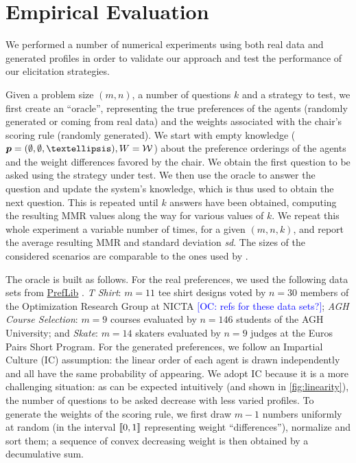 \documentclass{article}
\newcommand{\commentOC}[1]{\textcolor{blue}{\small$\big[$OC: #1$\big]$}}
\begin{document}

\section{Empirical Evaluation} 
\label{sec:experiments}
We  performed a number of numerical experiments using both real data and generated profiles in order to validate our approach and test the performance of our elicitation strategies. %

Given a problem size $(m, n)$, a number of questions $k$ and a strategy to test, we first create an “oracle”, representing the true preferences of the agents (randomly generated or coming from real data) and the weights associated with the chair’s scoring rule (randomly generated).
We start with empty knowledge ($\pprofile = (\emptyset, \emptyset, …), W = \W$) about the preference orderings of the agents and the weight differences favored by the chair. We obtain the first question to be asked using the strategy under test. We then use the oracle to answer the question and update the system's knowledge, which is thus used to obtain the next question. This is repeated until $k$ answers have been obtained, computing the resulting MMR values along the way for various values of $k$. We repeat this whole experiment a variable number of times, for a given $(m, n, k)$, and report the average resulting MMR and standard deviation \textit{sd}. The sizes of the considered scenarios are comparable to the ones used by \citet{Cailloux2014}. 

The oracle is built as follows. 
For the real preferences, we used the following data sets from \href{https://www.preflib.org/}{PrefLib} \citep{PrefLib}. \textit{T Shirt}: $m = 11$ tee shirt designs voted by $n = 30$ members of the Optimization Research Group at NICTA \commentOC{refs for these data sets?}; \textit{AGH Course Selection}: $m = 9$ courses evaluated by $n = 146$ students of the AGH University; and \emph{Skate}: $m = 14$ skaters evaluated by $n = 9$ judges at the Euros Pairs Short Program.
For the generated preferences, we follow an Impartial Culture (IC) assumption: the linear order of each agent is drawn independently and all have the same probability of appearing. We adopt IC because it is a more challenging situation: as can be expected intuitively (and shown in \cref{fig:linearity}), the number of questions to be asked decrease with less varied profiles. 
To generate the weights of the scoring rule, we first draw $m - 1$ numbers uniformly at random (in the interval $\llbracket 0,1 \rrbracket$ representing weight ``differences''), normalize and sort them; a sequence of convex decreasing weight is then obtained by a decumulative sum.
\end{document}
